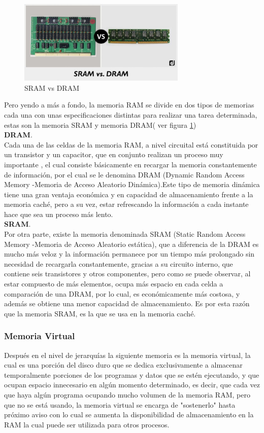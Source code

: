 \documentclass{article}
\begin{document}
\begin{figure}[h]
\includegraphics[width=8cm]{vs.jpg}
\centering
\caption{SRAM vs DRAM}
\label{vs}
\end{figure}

Pero yendo a más a fondo, la memoria RAM se divide en dos tipos de memorias cada una con unas especificaciones distintas para realizar una tarea determinada, estas son la memoria SRAM  y memoria DRAM( ver figura \ref{vs}) \\

\textbf{DRAM}.\\
Cada una de las celdas de la memoria RAM, a nivel circuital está constituida por un transistor y un capacitor, que en conjunto realizan un proceso muy importante , el cual consiste básicamente en recargar la memoria constantemente de información, por el cual se le denomina DRAM (Dynamic Random Access Memory -Memoria de Acceso Aleatorio Dinámica).Este tipo de memoria dinámica tiene una gran ventaja económica y en capacidad de almacenamiento frente a la memoria caché, pero a su vez, estar refrescando la información a cada instante hace que sea un proceso más  lento. \cite{augusto}\\

\noindent
\textbf{SRAM}.\\
Por otra parte, existe la memoria denominada SRAM (Static Random Access Memory -Memoria de Acceso Aleatorio estática), que a diferencia de la DRAM es mucho más veloz y la información permanece por un tiempo más prolongado sin necesidad de recargarla constantemente, gracias a su circuito interno, que contiene seis transistores y otros componentes, pero como se puede observar, al estar compuesto de más elementos, ocupa más espacio en cada celda a comparación de una DRAM, por lo cual, es económicamente más costosa, y además se obtiene una menor capacidad de almacenamiento. Es por esta razón que la memoria SRAM, es la que se usa en la memoria caché.



\subsubsection{Memoria Virtual}
Después en el nivel de jerarquías la siguiente memoria es la memoria virtual, la cual es una porción del disco duro que se dedica exclusivamente a almacenar temporalmente porciones de los programas y datos que se estén ejecutando, y que ocupan espacio innecesario en algún momento determinado, es decir, que cada vez que haya algún programa ocupando mucho volumen de la memoria RAM, pero que no se está usando, la memoria virtual se encarga de "sostenerlo" hasta próximo aviso con lo cual se aumenta la disponibilidad de almacenamiento en la RAM la cual puede ser utilizada para otros procesos. \cite{augusto}
\end{document}
